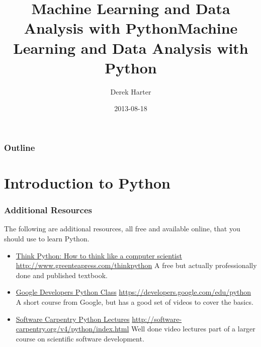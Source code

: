 \documentclass[bigger]{beamer}
\title[CSci538: Machine Learning]{Machine Learning and Data Analysis with Python}
\institute[TAMUC]{\texttt{[image: figs/tamuc-logo.eps]}}
\title{Machine Learning and Data Analysis with Python}
\author{Derek Harter}
\date{2013-08-18}
\begin{document}
\maketitle

\begin{frame}
\frametitle{Outline}
\setcounter{tocdepth}{3}
\tableofcontents
\end{frame}
\section{Introduction to Python}
\label{sec-1}
\begin{frame}
\frametitle{Additional Resources}
\label{sec-1-1}

The following are additional resources, all free and available online, that you should use to learn Python.

\begin{itemize}
\item \href{http://www.greenteapress.com/thinkpython}{Think Python: How to think like a computer scientist}  \href{http://www.greenteapress.com/thinkpython}{http://www.greenteapress.com/thinkpython}
     A free but actually professionally done and published textbook.
\item \href{https://developers.google.com/edu/python}{Google Developers Python Class} \href{https://developers.google.com/edu/python}{https://developers.google.com/edu/python}
     A short course from Google, but has a good set of videos to cover the basics.
\item \href{http://software-carpentry.org/v4/python/index.html}{Software Carpentry Python Lectures} \href{http://software-carpentry.org/v4/python/index.html}{http://software-carpentry.org/v4/python/index.html}
     Well done video lectures part of a larger course on scientific software development.
\end{itemize}
\end{frame}
\end{document}
